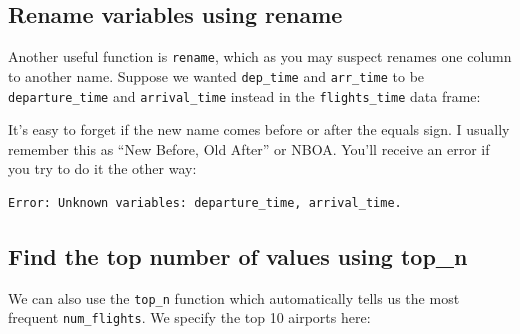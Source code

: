 \documentclass[]{tufte-book}
\newenvironment{Shaded}{\begin{snugshade}}{\end{snugshade}}
\newcommand{\KeywordTok}[1]{\textcolor[rgb]{0.13,0.29,0.53}{\textbf{{#1}}}}
\newcommand{\DataTypeTok}[1]{\textcolor[rgb]{0.13,0.29,0.53}{{#1}}}
\newcommand{\DecValTok}[1]{\textcolor[rgb]{0.00,0.00,0.81}{{#1}}}
\newcommand{\StringTok}[1]{\textcolor[rgb]{0.31,0.60,0.02}{{#1}}}
\newcommand{\NormalTok}[1]{{#1}}
\begin{document}
\subsection{Rename variables using rename}\label{rename}

Another useful function is \texttt{rename}, which as you may suspect
renames one column to another name. Suppose we wanted \texttt{dep\_time}
and \texttt{arr\_time} to be \texttt{departure\_time} and
\texttt{arrival\_time} instead in the \texttt{flights\_time} data frame:

\begin{Shaded}
\end{Shaded}

It's easy to forget if the new name comes before or after the equals
sign. I usually remember this as ``New Before, Old After'' or NBOA.
You'll receive an error if you try to do it the other way:

\begin{verbatim}
Error: Unknown variables: departure_time, arrival_time.
\end{verbatim}

\subsection{Find the top number of values using
top\_n}\label{find-the-top-number-of-values-using-top_n}

We can also use the \texttt{top\_n} function which automatically tells
us the most frequent \texttt{num\_flights}. We specify the top 10
airports here:

\begin{Shaded}
\end{Shaded}
\end{document}
